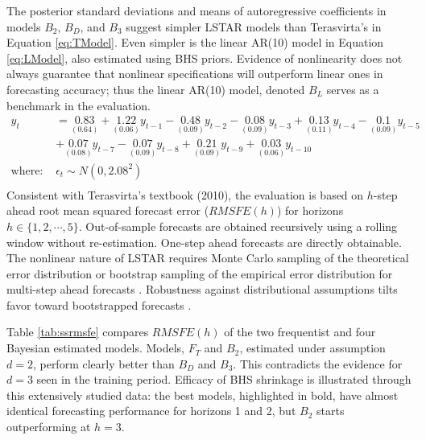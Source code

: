 The posterior standard deviations and means of autoregressive coefficients in models $B_2$, $B_D$, and $B_3$ suggest simpler LSTAR models than Terasvirta's in Equation \ref{eq:TModel}. Even simpler is the linear AR(10) model in Equation \ref{eq:LModel}, also estimated using BHS priors. Evidence of nonlinearity does not always guarantee that nonlinear specifications will outperform linear ones in forecasting accuracy\citep{Montgomery1998,Terasvirta2005}; thus the linear AR(10) model, denoted $B_{L}$ serves as a benchmark in the evaluation.
\begin{equation}
\begin{split}
 	y_t &=\underset{(0.64)}{0.83}+\underset{(0.06)}{1.22}y_{t-1}-\underset{(0.09)}{0.48}y_{t-2}-\underset{(0.09)}{0.08}y_{t-3}+\underset{(0.11)}{0.13}y_{t-4}-\underset{(0.09)}{0.1}y_{t-5}\\
 	&+\underset{(0.08)}{0.07}y_{t-7}-\underset{(0.09)}{0.07}y_{t-8}+\underset{(0.09)}{0.21}y_{t-9}+\underset{(0.06)}{0.03}y_{t-10}\\
 	\textrm{where: } & \hat{\epsilon}_t \sim N(0, 2.08^2)\\
\end{split}
\label{eq:LModel}
\end{equation}
Consistent with Terasvirta's textbook (2010), the evaluation is based on $h$-step ahead root mean squared forecast error ($RMSFE(h)$) for horizons $h \in \{1,2,\cdots,5\}$. Out-of-sample forecasts are obtained recursively using a rolling window without re-estimation. One-step ahead forecasts are directly obtainable. The nonlinear nature of LSTAR requires Monte Carlo sampling of the theoretical error distribution \citep{Peguin1994} or bootstrap sampling of the empirical error distribution for multi-step ahead forecasts \citep{Dijk2002,Lundbergh2002}. Robustness against distributional assumptions tilts favor toward bootstrapped forecasts \citep{Lin1994}. 

Table \ref{tab:ssrmsfe} compares $RMSFE(h)$ of the two frequentist  and four Bayesian estimated models. Models, $F_T$ and $B_2$, estimated under assumption $d=2$, perform clearly better than $B_D$ and $B_3$. This contradicts the evidence for $d=3$ seen in the training period. Efficacy of BHS shrinkage is illustrated through this extensively studied data: the best models, highlighted in bold, have almost identical forecasting performance for horizons 1 and 2, but $B_2$ starts outperforming at $h=3$. 

